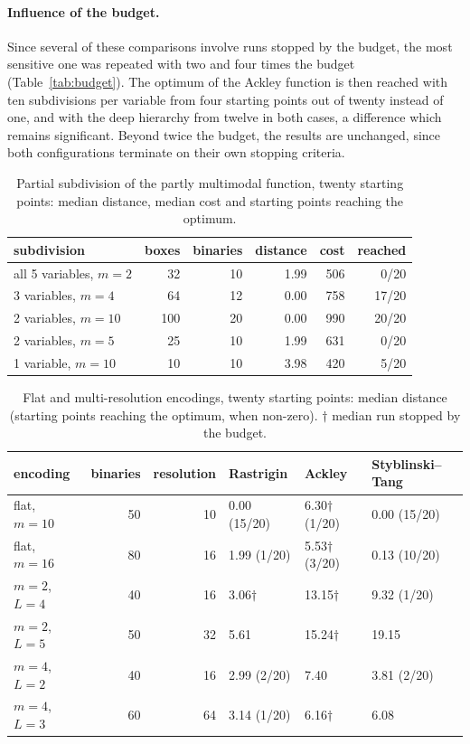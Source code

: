 \documentclass[pdflatex,sn-basic]{sn-jnl}
\newenvironment{appendices}{\appendix}{}
\begin{document}
\begin{appendices}
\paragraph{Influence of the budget.} Since several of these comparisons involve
runs stopped by the budget, the most sensitive one was repeated with two and four
times the budget (Table~\ref{tab:budget}). The optimum of the Ackley function is
then reached with ten subdivisions per variable from four starting points out of
twenty instead of one, and with the deep hierarchy from twelve in both cases, a
difference which remains significant. Beyond twice the budget, the results are
unchanged, since both configurations terminate on their own stopping criteria.

\begin{table}[h]
  \centering
  \caption{Partial subdivision of the partly multimodal function, twenty
    starting points: median distance, median cost and starting points reaching
    the optimum.}
  \label{tab:partial}
  \small
  \begin{tabular}{lrrrrr}
    \toprule
    subdivision & boxes & binaries & distance & cost & reached \\
    \midrule
    all 5 variables, $m=2$ & 32  & 10 & 1.99 & 506 & 0/20 \\
    3 variables, $m=4$     & 64  & 12 & 0.00 & 758 & 17/20 \\
    2 variables, $m=10$    & 100 & 20 & 0.00 & 990 & 20/20 \\
    2 variables, $m=5$     & 25  & 10 & 1.99 & 631 & 0/20 \\
    1 variable, $m=10$     & 10  & 10 & 3.98 & 420 & 5/20 \\
    \bottomrule
  \end{tabular}
\end{table}

\begin{table}[h]
  \centering
  \caption{Flat and multi-resolution encodings, twenty starting points: median
    distance (starting points reaching the optimum, when non-zero). $\dagger$
    median run stopped by the budget.}
  \label{tab:multires}
  \small
  \begin{tabular}{lrrlll}
    \toprule
    encoding & binaries & resolution & Rastrigin & Ackley & Styblinski--Tang \\
    \midrule
    flat, $m=10$          & 50 & 10 & 0.00 (15/20)  & 6.30$\dagger$ (1/20) & 0.00 (15/20) \\
    flat, $m=16$          & 80 & 16 & 1.99 (1/20)   & 5.53$\dagger$ (3/20) & 0.13 (10/20) \\
    $m=2$, $L=4$          & 40 & 16 & 3.06$\dagger$ & 13.15$\dagger$       & 9.32 (1/20) \\
    $m=2$, $L=5$          & 50 & 32 & 5.61          & 15.24$\dagger$       & 19.15 \\
    $m=4$, $L=2$          & 40 & 16 & 2.99 (2/20)   & 7.40                 & 3.81 (2/20) \\
    $m=4$, $L=3$          & 60 & 64 & 3.14 (1/20)   & 6.16$\dagger$        & 6.08 \\
    \bottomrule
  \end{tabular}
\end{table}


\end{appendices}
\end{document}
